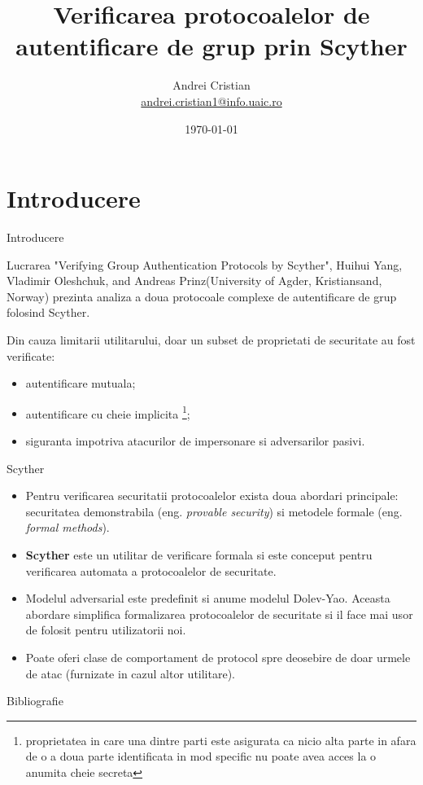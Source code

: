 \documentclass[11pt]{beamer}
\author{Andrei Cristian\\
\href{mailto:andrei.cristian1@info.uaic.ro}{andrei.cristian1@info.uaic.ro}}
\title{Verificarea protocoalelor de autentificare de grup prin Scyther}
\date{\today}
\begin{document}
\begin{frame}
\titlepage
\end{frame}

\begin{frame}
\tableofcontents
\end{frame}

\section{Introducere}

\begin{frame}{Introducere}

Lucrarea "Verifying Group Authentication Protocols by Scyther", Huihui Yang, Vladimir Oleshchuk, and Andreas Prinz(University of Agder, Kristiansand, Norway) prezinta analiza a doua protocoale complexe de autentificare de grup folosind Scyther.

Din cauza limitarii utilitarului, doar un subset de proprietati de securitate au fost verificate:
\begin{itemize}
\item autentificare mutuala;
\item autentificare cu cheie implicita \footnote{proprietatea in care una dintre parti este asigurata ca nicio alta parte in afara de o a doua parte identificata in mod specific nu poate avea acces la o anumita cheie secreta};
\item siguranta impotriva atacurilor de impersonare si adversarilor pasivi.
\end{itemize}

\end{frame}

\begin{frame}{Scyther}
\begin {itemize}
\item Pentru verificarea securitatii protocoalelor exista doua abordari principale: securitatea demonstrabila (eng. \textit{provable security}) si metodele formale (eng. \textit{formal methods}).
\item \textbf{Scyther} este un utilitar de verificare formala si este conceput pentru verificarea automata a protocoalelor de securitate.
\item Modelul adversarial este predefinit si anume modelul Dolev-Yao. Aceasta abordare simplifica formalizarea protocoalelor de securitate si il face mai usor de folosit pentru utilizatorii noi.
\item Poate oferi clase de comportament de protocol spre deosebire de doar urmele de atac (furnizate in cazul altor utilitare).

\end{itemize}
\end{frame}


\begin{frame}[t,allowframebreaks]{Bibliografie}
\printbibliography
\end{frame}
\end{document}
